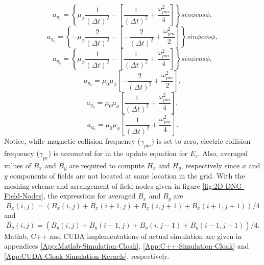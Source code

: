 \begin{equation*}
a_{y_4}=\left\lbrace\mu_{\phi}\dfrac{1}{(\Delta t)^2}-\left[\dfrac{1}{(\Delta t)^2}+\dfrac{\omega_{pm}^2}{4}\right]\right\rbrace sin\phi cos\phi,
\end{equation*}
\begin{equation*}
a_{y_5}=\left\lbrace-\mu_{\phi}\dfrac{2}{(\Delta t)^2}-\left[-\dfrac{2}{(\Delta t)^2}+\dfrac{\omega_{pm}^2}{2}\right]\right\rbrace sin\phi cos\phi,
\end{equation*}
\begin{equation*}
a_{y_6}=\left\lbrace\mu_{\phi}\dfrac{1}{(\Delta t)^2}-\left[\dfrac{1}{(\Delta t)^2}+\dfrac{\omega_{pm}^2}{4}\right]\right\rbrace sin\phi cos\phi,
\end{equation*}
\begin{equation*}
a_{y_7}=\mu_0\mu_{\phi}\left[-\dfrac{2}{(\Delta t)^2}+\dfrac{\omega_{pm}^2}{2}\right],
\end{equation*}
\begin{equation*}
a_{y_8}=\mu_0\mu_{\phi}\left[\dfrac{1}{(\Delta t)^2}+\dfrac{\omega_{pm}^2}{4}\right],
\end{equation*}
\begin{equation*}
a_{y_9}=\mu_0\mu_{\phi}\left[\dfrac{1}{(\Delta t)^2}+\dfrac{\omega_{pm}^2}{4}\right].
\end{equation*}
Notice, while magnetic collision frequency ($\gamma_{pm}$) is set to zero, electric collision frequency ($\gamma_{pe}$) is accounted for in the update equation for $E_z$. Also, averaged values of $B_x$ and $B_y$ are required to compute $H_x$ and $H_y$, respectively since $x$ and $y$ components of fields are not located at same location in the grid. With the meshing scheme and arrangement of field nodes given in figure \ref{fig:2D-DNG-Field-Nodes}, the expressions for averaged $B_x$ and $B_y$ are
\begin{equation}
\overline{B_x}(i,j) = \left(B_x(i,j)+B_x(i+1,j)+B_x(i,j+1)+B_x(i+1,j+1)\right)/4
\end{equation}
and
\begin{equation}
\overline{B_y}(i,j) = \left(B_y(i,j)+B_y(i-1,j)+B_y(i,j-1)+B_y(i-1,j-1)\right)/4.
\end{equation}
Matlab, C++ and CUDA implementations of actual simulation are given in appendices \ref{App:Matlab-Simulation-Cloak}, \ref{App:C++-Simulation-Cloak} and \ref{App:CUDA-Cloak-Simulation-Kernels}, respectively.
